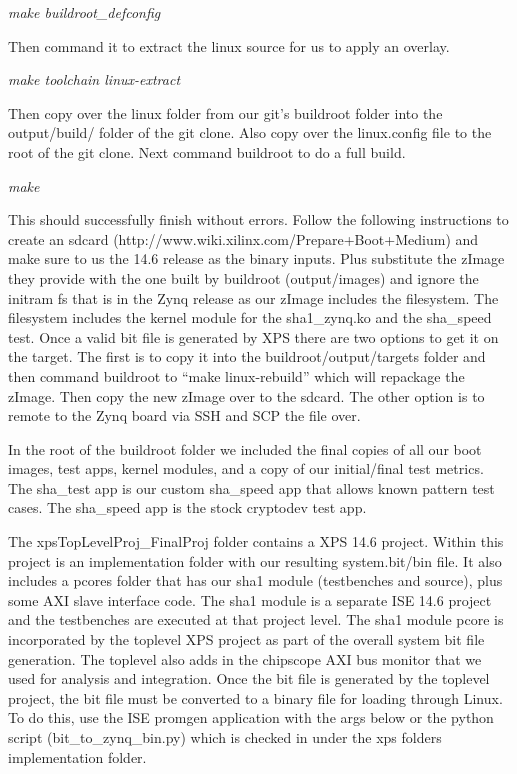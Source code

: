 \documentclass[journal]{IEEEtran}
\begin{document}
	\emph{make buildroot\_defconfig}
	
Then command it to extract the linux source for us to apply an overlay.

	\emph{make toolchain linux-extract}
	
Then copy over the linux folder from our git's buildroot folder into the output/build/ folder of the git clone.  Also copy over the linux.config file to the root of the git clone.  Next command buildroot to do a full build.

	\emph{make} 
	
This should successfully finish without errors.  Follow the following instructions to create an sdcard (http://www.wiki.xilinx.com/Prepare+Boot+Medium) and make sure to us the 14.6 release as the binary inputs.  Plus substitute the zImage they provide with the one built by buildroot (output/images) and ignore the initram fs that is in the Zynq release as our zImage includes the filesystem.  The filesystem includes the kernel module for the sha1\_zynq.ko and the sha\_speed test.  Once a valid bit file is generated by XPS there are two options to get it on the target.  The first is to copy it into the buildroot/output/targets folder and then command buildroot to “make linux-rebuild” which will repackage the zImage.  Then copy the new zImage over to the sdcard.  The other option is to remote to the Zynq board via SSH and SCP the file over.

In the root of the buildroot folder we included the final copies of all our boot images, test apps, kernel modules, and a copy of our initial/final test metrics.  The sha\_test app is our custom sha\_speed app that allows known pattern test cases.  The sha\_speed app is the stock cryptodev test app.

The xpsTopLevelProj\_FinalProj folder contains a XPS 14.6 project.  Within this project is an implementation folder with our resulting system.bit/bin file.  It also includes a pcores folder that has our sha1 module (testbenches and source), plus some AXI slave interface code.  The sha1 module is a separate ISE 14.6 project and the testbenches are executed at that project level.  The sha1 module pcore is incorporated by the toplevel XPS project as part of the overall system bit file generation.  The toplevel also adds in the chipscope AXI bus monitor that we used for analysis and integration.  Once the bit file is generated by the toplevel project, the bit file must be converted to a binary file for loading through Linux.  To do this, use the ISE promgen application with the args below or the python script (bit\_to\_zynq\_bin.py) which is checked in under the xps folders implementation folder.
\end{document}
